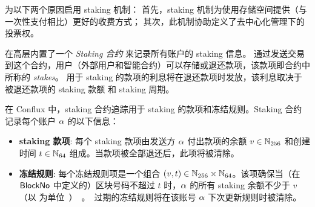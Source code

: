 \name 为以下两个原因启用 staking 机制：
首先，staking 机制为使用存储空间提供（与一次性支付相比）更好的收费方式；
其次，此机制协助定义了去中心化管理下的投票权。

\name 在高层内置了一个 \emph{Staking 合约} 来记录所有账户的 staking 信息。
通过发送交易到这个合约，用户（外部用户和智能合约）可以存储或退还款项，该款项即合约中所称的 \emph{stakes}。
用于 staking 的款项的利息将在退还款项时发放，该利息取决于被退还款项的 staking 款额 和 staking 周期。


在 Conflux 中，staking 合约追踪用于 staking 的款项和冻结规则。Staking 合约记录每个账户 $\mathbf{\alpha}$ 的以下信息：
\begin{itemize}
	\item {\bf staking 款项}: 每个 staking 款项由发送方 $\mathbf{\alpha}$ 付出款项的余额 $v\in\mathbb{N}_{256}$ 和创建时间 $t\in\mathbb{N}_{64}$ 组成。当款项被全部退还后，此项将被清除。
	

	\item {\bf 冻结规则}: 每个冻结规则项是一个组合 $(v,t)\in \mathbb{N}_{256}\times\mathbb{N}_{64}$。该项确保当（在 \hyperlink{blockno}{$\mathsf{BlockNo}$} 中定义的）区块号码不超过 $t$ 时，$\mathbf{\alpha}$ 的所有 staking 余额不少于 $v$ （以 \unit 为单位）。
	过期的冻结规则将在该账号 $\mathbf{\alpha}$ 下次更新规则时被清除。
\end{itemize}

